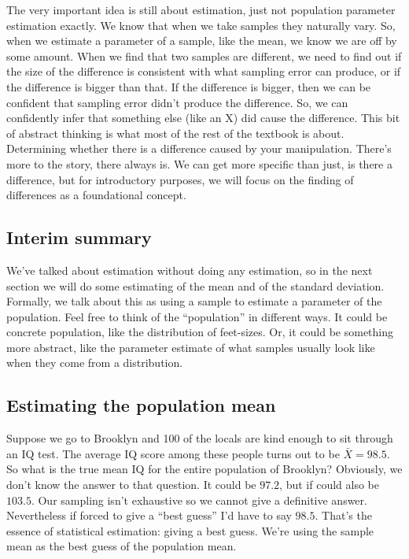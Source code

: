 \documentclass[
  letterpaper,
  DIV=11,
  numbers=noendperiod]{scrreprt}
\begin{document}
The very important idea is still about estimation, just not population
parameter estimation exactly. We know that when we take samples they
naturally vary. So, when we estimate a parameter of a sample, like the
mean, we know we are off by some amount. When we find that two samples
are different, we need to find out if the size of the difference is
consistent with what sampling error can produce, or if the difference is
bigger than that. If the difference is bigger, then we can be confident
that sampling error didn't produce the difference. So, we can
confidently infer that something else (like an X) did cause the
difference. This bit of abstract thinking is what most of the rest of
the textbook is about. Determining whether there is a difference caused
by your manipulation. There's more to the story, there always is. We can
get more specific than just, is there a difference, but for introductory
purposes, we will focus on the finding of differences as a foundational
concept.

\subsection{Interim summary}\label{interim-summary}

We've talked about estimation without doing any estimation, so in the
next section we will do some estimating of the mean and of the standard
deviation. Formally, we talk about this as using a sample to estimate a
parameter of the population. Feel free to think of the ``population'' in
different ways. It could be concrete population, like the distribution
of feet-sizes. Or, it could be something more abstract, like the
parameter estimate of what samples usually look like when they come from
a distribution.

\subsection{Estimating the population
mean}\label{estimating-the-population-mean}

Suppose we go to Brooklyn and 100 of the locals are kind enough to sit
through an IQ test. The average IQ score among these people turns out to
be \(\bar{X}=98.5\). So what is the true mean IQ for the entire
population of Brooklyn? Obviously, we don't know the answer to that
question. It could be \(97.2\), but if could also be \(103.5\). Our
sampling isn't exhaustive so we cannot give a definitive answer.
Nevertheless if forced to give a ``best guess'' I'd have to say
\(98.5\). That's the essence of statistical estimation: giving a best
guess. We're using the sample mean as the best guess of the population
mean.
\end{document}

